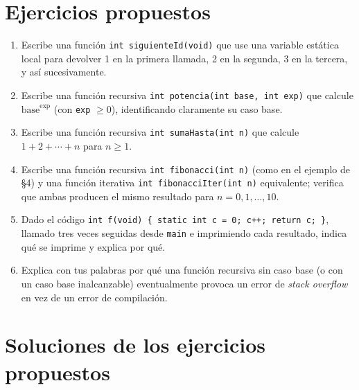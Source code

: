 \documentclass[11pt,letterpaper]{article}
\theoremstyle{definition}
\begin{document}
\section{Ejercicios propuestos}

\begin{enumerate}[leftmargin=1.2cm]
  \item Escribe una función \texttt{int siguienteId(void)} que use una variable estática local para
        devolver 1 en la primera llamada, 2 en la segunda, 3 en la tercera, y así sucesivamente.
  \item Escribe una función recursiva \texttt{int potencia(int base, int exp)} que calcule
        $\text{base}^{\text{exp}}$ (con \texttt{exp} $\geq 0$), identificando claramente su caso
        base.
  \item Escribe una función recursiva \texttt{int sumaHasta(int n)} que calcule
        $1 + 2 + \cdots + n$ para $n \geq 1$.
  \item Escribe una función recursiva \texttt{int fibonacci(int n)} (como en el ejemplo de \S 4) y
        una función iterativa \texttt{int fibonacciIter(int n)} equivalente; verifica que ambas
        producen el mismo resultado para $n = 0, 1, \ldots, 10$.
  \item Dado el código
        \texttt{int f(void) \{ static int c = 0; c++; return c; \}}, llamado tres veces seguidas
        desde \texttt{main} e imprimiendo cada resultado, indica qué se imprime y explica por qué.
  \item Explica con tus palabras por qué una función recursiva sin caso base (o con un caso base
        inalcanzable) eventualmente provoca un error de \emph{stack overflow} en vez de un error de
        compilación.
\end{enumerate}

\section{Soluciones de los ejercicios propuestos}
\end{document}
